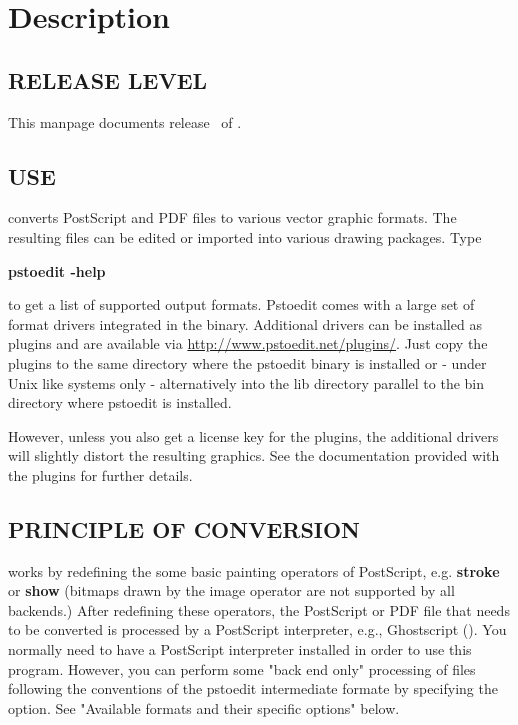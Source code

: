 \documentclass[english,a4paper]{article}
\let\URL\url \let\Email\url \let\File\url
\begin{document}
 
\section{Description}

\subsection{RELEASE LEVEL}

This manpage documents release \Version\ of . 

\subsection{USE}

 converts PostScript and PDF files to various vector graphic
formats. The resulting files can be edited or imported into various drawing
packages. Type 

     \textbf{pstoedit -help} 
     
\noindent to get a list of supported output formats. Pstoedit comes with a
large set of format drivers integrated in the binary. Additional drivers can be
installed as plugins and are available via 
\URL{http://www.pstoedit.net/plugins/}. 
Just copy the plugins to the same directory where the pstoedit binary is installed or - under Unix like systems only - alternatively into the lib directory parallel to the bin directory where pstoedit is installed.

However, unless you also get a license key for the plugins, the additional
drivers will slightly distort the resulting graphics. See the documentation
provided with the plugins for further details.

\subsection{PRINCIPLE OF CONVERSION}

 works by redefining the some basic painting operators of
PostScript, e.g. \textbf{stroke} or \textbf{show} (bitmaps drawn by the image
operator are not supported by all backends.) After
redefining these operators, the PostScript or PDF file that needs to be
converted is processed by a PostScript interpreter, e.g., Ghostscript
(). You normally need to have a PostScript interpreter installed in
order to use this program. However, you can perform some "back end only" processing
of files following the conventions of the pstoedit intermediate formate by specifying the  option. See "Available formats and their specific options" below. 
\end{document}
